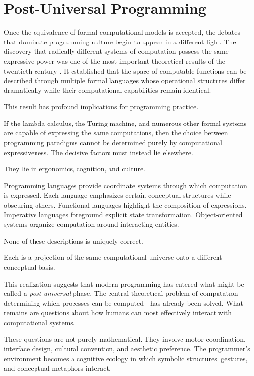 \documentclass[11pt]{article}
\theoremstyle{definition}
\begin{document}
\section{Post-Universal Programming}

Once the equivalence of formal computational models is accepted, the
debates that dominate programming culture begin to appear in a
different light. The discovery that radically different systems of
computation possess the same expressive power was one of the most
important theoretical results of the twentieth century
\cite{church1936,turing1936,kleene1952}. It established
that the space of computable functions can be described through
multiple formal languages whose operational structures differ
dramatically while their computational capabilities remain identical.

This result has profound implications for programming practice.

If the lambda calculus, the Turing machine, and numerous other formal
systems are capable of expressing the same computations, then the
choice between programming paradigms cannot be determined purely by
computational expressiveness. The decisive factors must instead lie
elsewhere.

They lie in ergonomics, cognition, and culture.

Programming languages provide coordinate systems through which
computation is expressed. Each language emphasizes certain conceptual
structures while obscuring others. Functional languages highlight the
composition of expressions. Imperative languages foreground explicit
state transformation. Object-oriented systems organize computation
around interacting entities.

None of these descriptions is uniquely correct.

Each is a projection of the same computational universe onto a
different conceptual basis.

This realization suggests that modern programming has entered what
might be called a \emph{post-universal} phase. The central theoretical
problem of computation—determining which processes can be computed—has
already been solved. What remains are questions about how humans can
most effectively interact with computational systems.

These questions are not purely mathematical. They involve motor
coordination, interface design, cultural convention, and aesthetic
preference. The programmer's environment becomes a cognitive ecology
in which symbolic structures, gestures, and conceptual metaphors
interact.
\end{document}
